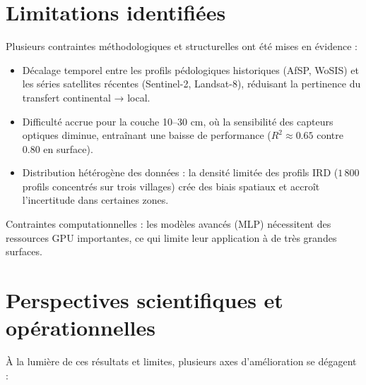 \documentclass[12pt,a4paper,oneside]{report}
\begin{document}
\section{Limitations identifiées  }
Plusieurs contraintes méthodologiques et structurelles ont été mises en évidence :
\begin{itemize}
  \item Décalage temporel entre les profils pédologiques historiques (AfSP, WoSIS) et les séries satellites récentes (Sentinel-2, Landsat-8), réduisant la pertinence du transfert continental → local.

  \item Difficulté accrue pour la couche 10--30 cm, où la sensibilité des capteurs optiques diminue, entraînant une baisse de performance (\( R^2 \approx 0.65 \) contre \( 0.80 \) en surface).

  \item Distribution hétérogène des données : la densité limitée des profils IRD (\( 1\,800 \) profils concentrés sur trois villages) crée des biais spatiaux et accroît l’incertitude dans certaines zones.
\end{itemize}

Contraintes computationnelles : les modèles avancés (MLP) nécessitent des ressources GPU importantes, ce qui limite leur application à de très grandes surfaces.

\section{Perspectives scientifiques et opérationnelles}
À la lumière de ces résultats et limites, plusieurs axes d’amélioration se dégagent :
\end{document}
